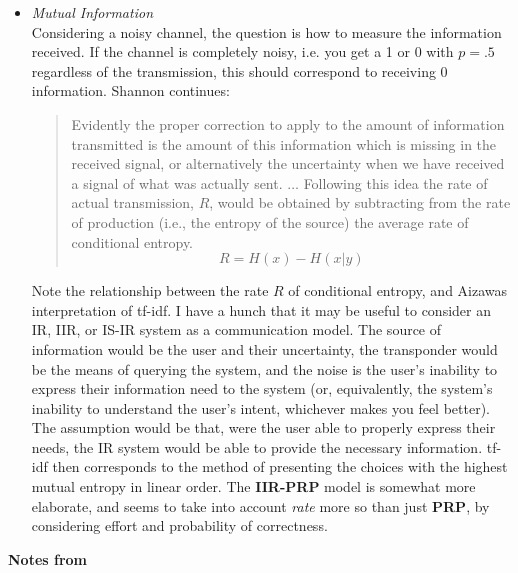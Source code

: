 \documentclass{article}
\newcommand{\note}[1]{{\footnotesize #1}}
\newcommand{\hi}[1]{{\large {\bf #1}}}
\newcommand{\hii}[1]{{\it #1}}
\begin{document}
\begin{itemize}

\item \hii{Mutual Information}\\
    Considering a noisy channel, the question is how to measure the information received.  If the channel is completely noisy, i.e. you get a 1 or 0 with $p=.5$ regardless of the transmission, this should correspond to receiving 0 information.  Shannon continues:
        \begin{quote}
            Evidently the proper correction to apply to the amount of information transmitted is the amount of this information which is missing in the received signal, or alternatively the uncertainty when we have received a signal of what was actually sent. $\dots$ Following this idea the rate of actual transmission, $R$, would be obtained by subtracting from the rate of production (i.e., the entropy of the source) the average rate of conditional entropy.
                \[ R = H(x) - H(x|y) \]
        \end{quote}
    \note{Note the relationship between the rate $R$ of conditional entropy, and Aizawas interpretation of tf-idf.  I have a hunch that it may be useful to consider an IR, IIR, or IS-IR system as a communication model.  The source of information would be the user and their uncertainty, the transponder would be the means of querying the system, and the noise is the user's inability to express their information need to the system (or, equivalently, the system's inability to understand the user's intent, whichever makes you feel better).  The assumption would be that, were the user able to properly express their needs, the IR system would be able to provide the necessary information.  tf-idf then corresponds to the method of presenting the choices with the highest mutual entropy in linear order.  The {\bf IIR-PRP} model is somewhat more elaborate, and seems to take into account {\it rate} more so than just {\bf PRP}, by considering effort and probability of correctness.}

\end{itemize}

\hi{Notes from \cite{lavrenko01}}
\end{document}
